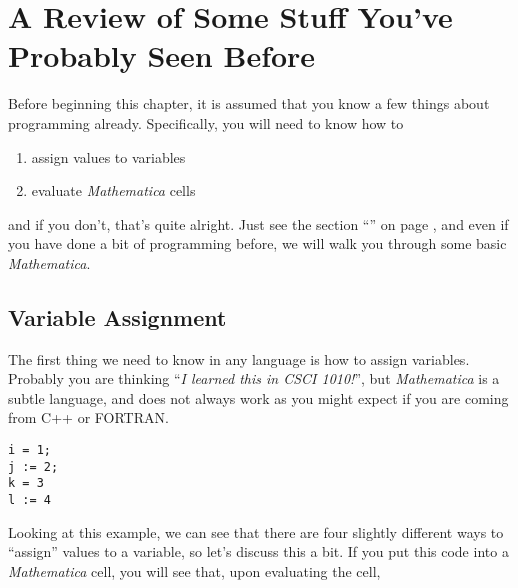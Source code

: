 \chapter[Stuff You've Seen Before]{A Review of Some Stuff You've Probably Seen Before}
\label{chap:SeenBefore}

Before beginning this chapter, it is assumed that you know a few things about programming already. Specifically, you will need to know how to
\begin{enumerate}
	   \item assign values to variables
	   \item evaluate \emph{Mathematica} cells
\end{enumerate}
and if you don't, that's quite alright. Just see the section ``\emph{}'' on page \pageref{chap:Prelim}, and even if you have done a bit of programming before, we will walk you through some basic \emph{Mathematica}.

\section{Variable Assignment}
The first thing we need to know in any language is how to assign variables. Probably you are thinking ``\emph{I learned this in CSCI 1010!}'', but \emph{Mathematica} is a subtle language, and does not always work as you might expect if you are coming from C++ or FORTRAN.

\begin{verbatim}
i = 1;
j := 2;
k = 3
l := 4
\end{verbatim}

Looking at this example, we can see that there are four slightly different ways to ``assign'' values to a variable, so let's discuss this a bit. If you put this code into a \emph{Mathematica} cell, you will see that, upon evaluating the cell, 
